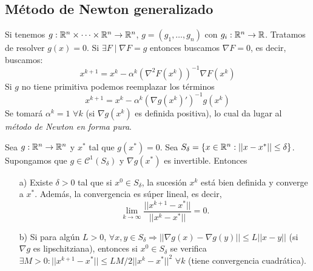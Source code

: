 \documentclass[MIOP.tex]{subfiles}
\begin{document}
\subsection{Método de Newton generalizado}
Si tenemos $g:\mathbb{R}^{n}\times\dots\times\mathbb{R}^{ n}\to \mathbb{R}^n$, $g=(g_1,\dotsc,g_n)$ con $g_i : \mathbb{R}^n \to \mathbb{R}$. Tratamos de resolver $g(x)=0$. Si $\exists F\mid \nabla F = g$ entonces buscamos $\nabla F =0$, es decir, buscamos:
\[
x^{k+1} =x^k - \alpha^k (\nabla^2 F(x^k))^{-1}\nabla F(x^k)
\]
Si $g$ no tiene primitiva podemos reemplazar los términos 
\[
x^{k+1}=x^k-\alpha^k(\nabla g(x^k)')^{-1} g(x^k)
\]
Se tomará $\alpha^k =1$ $\forall k$ (si $\nabla g(x^k)$ es definida positiva), lo cual da lugar al \emph{método de Newton en forma pura}.

\begin{teorema}
Sea $g:\mathbb{R}^n\to\mathbb{R}^n$ y $x^*$ tal que $g(x^*)=0$. Sea $S_\delta=\{x\in\mathbb{R}^n:||x-x^*||\leq\delta\}$. Supongamos que $g\in\mathcal{C}^1(S_\delta)$ y $\nabla g(x^*)$ es invertible. Entonces
\begin{itemize}
\item[a)] Existe $\delta>0$ tal que si $x^0\in S_\delta$, la sucesión $x^k$ está bien definida y converge a $x^*$. Además, la convergencia es súper lineal, es decir,
$$\lim_{k\to\infty}\frac{||x^{k+1}-x^*||}{||x^k-x^*||}=0.$$
\item[b)] Si para algún $L>0$, $\forall x,y\in S_\delta\Rightarrow ||\nabla g(x)-\nabla g(y)||\leq L||x-y||$ (si $\nabla g$ es lipschitziana), entonces si $x^0\in S_\delta$ se verifica $\exists M>0:||x^{k+1}-x^*||\leq LM/2||x^k-x^*||^2$ $\forall k$ (tiene convergencia cuadrática).
\end{itemize}
\end{teorema}
\end{document}

